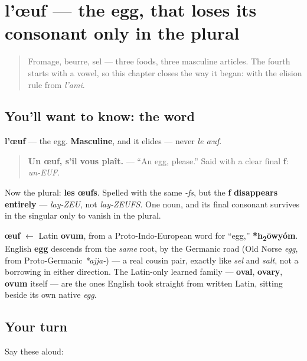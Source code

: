 \section[l'œuf, les œufs]{l'œuf — the egg, that loses its consonant only in the plural}

\label{lesson:FR-C30-oeuf}



\begin{quote}
Fromage, beurre, sel — three foods, three masculine articles. The fourth starts with a vowel, so this chapter closes the way it began: with the elision rule from \emph{l'ami}.
\end{quote}

\subsection*{You'll want to know: the word}
\textbf{l'œuf} — the egg. \textbf{Masculine}, and it elides — never \emph{le œuf}.

\begin{quote}
\textbf{Un œuf, s'il vous plaît.} — \textquotedblleft{}An egg, please.\textquotedblright{} Said with a clear final \textbf{f}: \emph{un-EUF}.
\end{quote}

Now the plural: \textbf{les œufs}. Spelled with the same \emph{-fs}, but the \textbf{f} \textbf{disappears entirely} — \emph{lay-ZEU}, not \emph{lay-ZEUFS}. One noun, and its final consonant survives in the singular only to vanish in the plural.

\begin{cousinweb}
\textbf{œuf} $\leftarrow$ Latin \textbf{ovum}, from a Proto-Indo-European word for \textquotedblleft{}egg,\textquotedblright{} \textbf{*h\textsubscript{2}ōwyóm}. English \textbf{egg} descends from the \emph{same} root, by the Germanic road (Old Norse \emph{egg}, from Proto-Germanic \emph{*ajja-}) — a real cousin pair, exactly like \emph{sel} and \emph{salt}, not a borrowing in either direction. The Latin-only learned family — \textbf{oval}, \textbf{ovary}, \textbf{ovum} itself — are the ones English took straight from written Latin, sitting beside its own native \emph{egg}.
\end{cousinweb}

\subsection*{Your turn}
Say these aloud:

